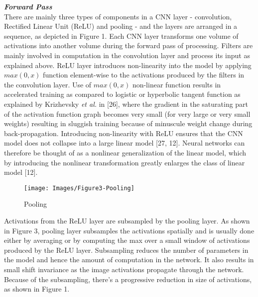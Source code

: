 \documentclass [11pt,letterpaper ,twoside ,openany ]{report}
\begin{document}
    \noindent
    \textbf{\textit{Forward Pass}} \\
    There are mainly three types of components in a CNN layer - convolution, Rectified Linear Unit (ReLU) and pooling - and the layers are arranged in a sequence, as depicted in Figure 1. Each CNN layer transforms one volume of activations into another volume during the forward pass of processing. Filters are mainly involved in computation in the convolution layer and process its input as explained above. ReLU layer introduces non-linearity into the model by applying \(max (0,x)\) function element-wise to the activations produced by the filters in the convolution layer. Use of \(max (0,x)\) non-linear function results in accelerated training as compared to logistic or hyperbolic tangent function as explained by Krizhevsky \textit {et al.} in [26], where the gradient in the saturating part of the activation function graph becomes very small (for very large or very small weights) resulting in sluggish training because of minuscule weight change during back-propagation. Introducing non-linearity with ReLU ensures that the CNN model does not collapse into a large linear model [27, 12]. Neural networks can therefore be thought of as a nonlinear generalization of the linear model, which by introducing the nonlinear transformation greatly enlarges the class of linear model [12].

    \begin{wrapfigure}{r}{0.6\textwidth}
        \begin{center}
            \texttt{[image: Images/Figure3-Pooling]}
        \end{center}
        \caption{Pooling}
    \end{wrapfigure}

    Activations from the ReLU layer are subsampled by the pooling layer. As shown in Figure 3, pooling layer subsamples the activations spatially and is usually done either by averaging or by computing the max over a small window of activations produced by the ReLU layer. Subsampling reduces the number of parameters in the model and hence the amount of computation in the network. It also results in small shift invariance as the image activations propagate through the network. Because of the subsampling, there's a progressive reduction in size of activations, as shown in Figure 1. \\
\end{document}
